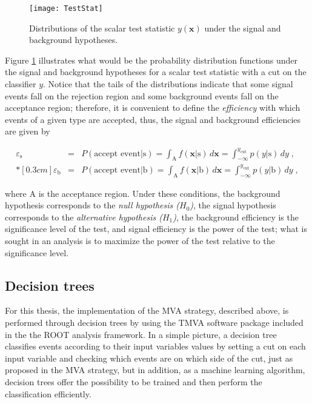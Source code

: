 \begin{figure}[!h]
  \centering
  \texttt{[image: TestStat]}
  \caption[Scalar test statistical.]{Distributions of the scalar test statistic $y(\textbf{x})$ under the signal and background hypotheses.\cite{mva}}\label{fig:scalar_test}
\end{figure}

Figure \ref{fig:scalar_test} illustrates what would be the probability distribution functions under the signal and background hypotheses for a scalar test statistic with a cut on the classifier $y$. Notice that the tails of the distributions indicate that some signal events fall on the rejection region and some background events fall on the acceptance region; therefore, it is convenient to define the \textit{efficiency} with which events of a given type are accepted, thus, the signal and background efficiencies are given by 

\begin{eqnarray}
\label{eq:sigeff}
\varepsilon_{\textrm{s}} & = & P( \mbox{accept event} | \mbox{s} ) = \int_{\textrm{A}} f(\textbf{x} | \mbox{s} ) \, d \textbf{x} = \int_{-\infty}^{y_{\textrm{cut}}} p(y | \mbox{s}) \, dy\;, \\*[0.3 cm]
\varepsilon_{\textrm{b}} & = & P( \mbox{accept event} | \mbox{b} ) = \int_{\textrm{A}} f(\textbf{x} | \mbox{b} ) \, d \textbf{x} = \int_{-\infty}^{y_{\textrm{cut}}} p(y | \mbox{b}) \, dy \;,
\end{eqnarray}

\noindent where A is the acceptance region. Under these conditions, the background hypothesis corresponds to the \textit{null hypothesis ($H_0$)}, the signal hypothesis corresponds to the \textit{alternative hypothesis ($H_1$)}, the background efficiency is the significance level of the test, and signal efficiency is the power of the test; what is sought in an analysis is to maximize the power of the test relative to the significance level.

\subsection{Decision trees }

For this thesis, the implementation of the MVA strategy, described above, is performed through decision trees by using the TMVA software package \cite{tmva} included in the the ROOT analysis framework\cite{root}. In a simple picture, a decision tree classifies events according to their input variables values by setting a cut on each input variable and checking which events are on which side of the cut, just as proposed in the MVA strategy, but in addition, as a machine learning algorithm, decision trees offer the possibility to be trained and then perform the classification efficiently.    


